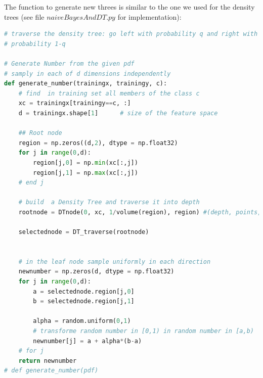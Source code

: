 \documentclass{article}
\begin{document}
The function to generate new threes is similar to the one we used for the density trees (see file $naiveBayesAndDT.py$ for implementation):

\begin{lstlisting}[language=Python]
# traverse the density tree: go left with probability q and right with 
# probability 1-q

# Generate Number from the given pdf
# samply in each of d dimensions independently
def generate_number(trainingx, trainingy, c):
    # find  in training set all members of the class c
    xc = trainingx[trainingy==c, :]        
    d = trainingx.shape[1]      # size of the feature space
    
    ## Root node
    region = np.zeros((d,2), dtype = np.float32)
    for j in range(0,d):
        region[j,0] = np.min(xc[:,j])
        region[j,1] = np.max(xc[:,j])
    # end j   
    
    # build  a Density Tree and traverse it into depth    
    rootnode = DTnode(0, xc, 1/volume(region), region) #(depth, points, p, region)
    
    selectednode = DT_traverse(rootnode)


    # in the leaf node sample uniformly in each direction
    newnumber = np.zeros(d, dtype = np.float32) 
    for j in range(0,d):
        a = selectednode.region[j,0]
        b = selectednode.region[j,1]
        
        alpha = random.uniform(0,1)
        # transforme random number in [0,1) in random number in [a,b)
        newnumber[j] = a + alpha*(b-a)
    # for j    
    return newnumber
# def generate_number(pdf)    
\end{lstlisting}    
\end{document}
